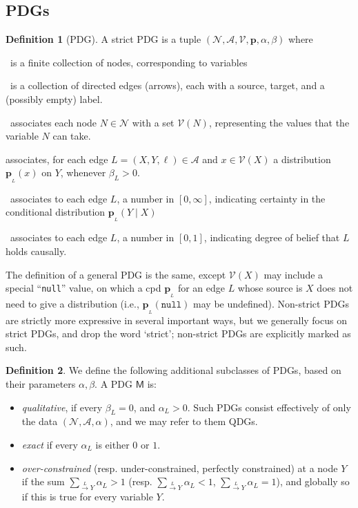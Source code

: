 \documentclass{article}
\newcommand{\bp}[1][L]{\mathbf{p}_{\!_#1\!}}
\newcommand{\V}{\mathcal V}
\newcommand{\N}{\mathcal N}
\newcommand{\Ed}{\mathcal A}
\newcommand{\dg}[1]{\mathsf #1}
\newcommand\mat[1]{\mathbf #1}
\theoremstyle{plain}
\theoremstyle{definition}
\newtheorem{defn}{Definition}
\theoremstyle{remark}
\begin{document}
\subsection{PDGs}
	\def\mnvars[#1]{(\N#1, \Ed#1, \V#1, \mat p#1, \alpha#1,\beta#1)}
	\begin{defn}[PDG]\label{def:model}
	A strict PDG is a tuple $\mnvars[]$ where
	\begin{description}[nosep]
		\item[$\N$]~is a finite collection of nodes, corresponding to variables
		\item[$\Ed$]~is a collection of directed edges (arrows), each with a source, target, and a (possibly empty) label.
		\item[$\V$]~associates each node $N \in \N$ with a set $\V(N)$,
		representing the values that the variable $N$ can take. 
		\item[$\mathbf p$] associates, for each edge $L = (X,Y, \ell) \in \Ed$ and $x \in \V(X)$ a distribution $\bp(x)$ on $Y$, whenever $\beta_L > 0$.
		\item[$\beta$]~associates to each edge $L$, a number in $[0,\infty]$, indicating certainty in the conditional distribution $\bp(Y \mid X)$ 
		\item[$\alpha$]~associates to each edge $L$, a number in $[0,1]$, indicating degree of belief that $L$ holds causally.
\end{description}
\end{defn}

The definition of a general PDG is the same, except $\mathcal V(X)$ may include a special ``\texttt{null}'' value, on which a cpd $\bp$ for an edge $L$ whose source is $X$ does not need to give a distribution (i.e., $\bp(\texttt{null})$ may be undefined). Non-strict PDGs are strictly more expressive in several important ways, but we generally focus on strict PDGs, and drop the word `strict'; non-strict PDGs are explicitly marked as such.


\begin{defn}
	We define the following additional subclasses of PDGs, based on their parameters $\alpha, \beta$. A PDG $\dg M$ is:
	\begin{itemize}[nosep]
		\item \emph{qualitative}, if every $\beta_L = 0$, and $\alpha_L > 0$. Such PDGs consist effectively of only the data $(\N, \Ed, \alpha)$, and we may refer to them QDGs.
		\item \emph{exact} if every $\alpha_L$ is either $0$ or $1$.
		\item \emph{over-constrained} (resp. under-constrained, perfectly constrained) at a node $Y$ if the sum $\sum_{\overset{L}{\to}Y} \alpha_L > 1$ (resp. $\sum_{\overset{L}{\to}Y} \alpha_L < 1$, $\sum_{\overset{L}{\to}Y} \alpha_L =1$), and globally so if this is true for every variable $Y$.
	\end{itemize}
\end{defn}
\end{document}
